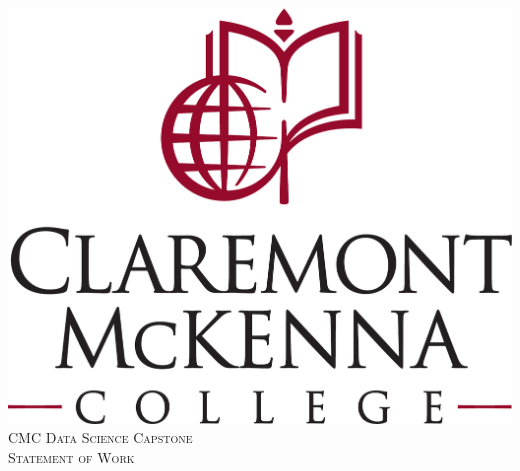 \documentclass{article}
\begin{document}
\begin{titlepage}

\center %
 

\includegraphics[scale=.15]{cmc_logo.pdf}\\[1cm] %
\textsc{\Large CMC Data Science Capstone}\\[0.5cm] 
\textsc{\Large Statement of Work}\\[0.5cm] %



\end{titlepage}
\end{document}

